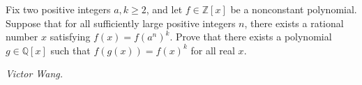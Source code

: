 Fix two positive integers $a,k\ge2$, and let $f\in\mathbb{Z}[x]$ be a nonconstant polynomial. Suppose that for all sufficiently large positive integers $n$, there exists a rational number $x$ satisfying $f(x)=f(a^n)^k$. Prove that there exists a polynomial $g\in\mathbb{Q}[x]$ such that $f(g(x))=f(x)^k$ for all real $x$.

\textit{Victor Wang.}